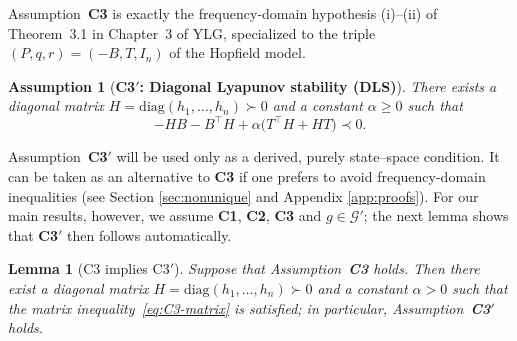 \documentclass[journal]{IEEEtran}
\newtheorem{lemma}{Lemma}
\newtheorem{assumption}{Assumption}
\begin{document}
Assumption~\textbf{C3} is exactly the frequency-domain hypothesis
\textup{(i)}–\textup{(ii)} of Theorem~3.1 in Chapter~3 of YLG,
specialized to the triple $(P,q,r)=(-B,T,I_n)$ of the Hopfield model.


\begin{assumption}[\bf C3$'$: Diagonal Lyapunov stability (DLS)]\label{ass:C3}
There exists a diagonal matrix $H=\mathrm{diag}(h_1,\dots,h_n)\succ 0$
and a constant $\alpha\ge 0$ such that
\begin{equation}\label{eq:C3-matrix}
  -HB - B^{\top}H + \alpha\bigl(T^{\top}H + HT\bigr) \prec 0 .
\end{equation}
\end{assumption}

Assumption~\textbf{C3$'$} will be used only as a derived, purely
state–space condition.  It can be taken as an alternative to
\textbf{C3} if one prefers to avoid frequency-domain inequalities (see Section \ref{sec:nonunique} and Appendix \ref{app:proofs}).
For our main results, however, we assume \textbf{C1}, \textbf{C2},
\textbf{C3} and $g\in\mathcal G'$; the next lemma shows that
\textbf{C3$'$} then follows automatically.

\begin{lemma}[C3 implies C3$'$]\label{lem:C3prime-implies-C3}
Suppose that Assumption~\textbf{C3} holds. Then there exist a
diagonal matrix $H=\mathrm{diag}(h_1,\dots,h_n)\succ 0$ and a constant
$\alpha>0$ such that the matrix inequality~\eqref{eq:C3-matrix} is
satisfied; in particular, Assumption~\textbf{C3$'$} holds.
\end{lemma}
\end{document}
